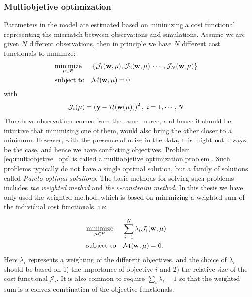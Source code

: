 \subsubsection{Multiobjetive optimization}
Parameters in the model are estimated based on minimizing a cost
functional representing the mismatch between observations and
simulations. Assume we are given $N$ different observations, then in
principle we have $N$ different cost functionals to minimize:
\begin{equation}
  \begin{aligned}
    \label{eq:multiobjetive_opt}
    & \underset{\mu \in P}{\text{minimize}}
    & &  \left\{ \mathcal{J}_1(\mathbf{w}, \mu), \mathcal{J}_2(\mathbf{w}, \mu), \cdots, \mathcal{J}_N(\mathbf{w}, \mu) \right\} \\
    & \text{subject to}
    & &\mathcal{M}(\mathbf{w}, \mu) = 0
  \end{aligned}
\end{equation}
with
\begin{align}
  \mathcal{J}_i(\mu) = \left( \mathbf{y} - \mathcal{H}(\mathbf{w}(\mu)) \right)^2, \; i = 1,\cdots, N
\end{align}
The above observations comes from the same source, and hence it should
be intuitive that minimizing one of them, would also bring the other
closer to a minimum. However, with the presence of noise in the data,
this might not always be the case, and hence we have conflicting
objectives. Problem \eqref{eq:multiobjetive_opt} is called a
multiobjetive optimization problem \cite{deb2016multi}. Such problems
typically do not have a single optimal solution, but a family of
solutions called \emph{Pareto optimal solutions}. The basic methods for
solving such problems includes \emph{the weighted method} and \emph{the
  $\varepsilon$-constraint method}. In this thesis we have only used
the weighted method, which is based on minimizing a weighted sum of
the individual cost functionals, i.e:

\begin{equation}
  \begin{aligned}
    \label{eq:weighted_method}
    & \underset{\mu \in P}{\text{minimize}}
    & &  \sum_{i=1}^N \lambda_i \mathcal{J}_i(\mathbf{w}, \mu) \\
    & \text{subject to}
    & &\mathcal{M}(\mathbf{w}, \mu) = 0.
  \end{aligned}
\end{equation}
Here $\lambda_i$ represents a weighting of the different objectives,
and the choice of $\lambda_i$ should be based on 1) the importance of
objective $i$ and 2) the relative size of the cost functional
$\mathcal{J}_i$. It is also common to require $\sum_i \lambda_i = 1$
so that the weighted sum is a convex combination of the objective
functionals.



